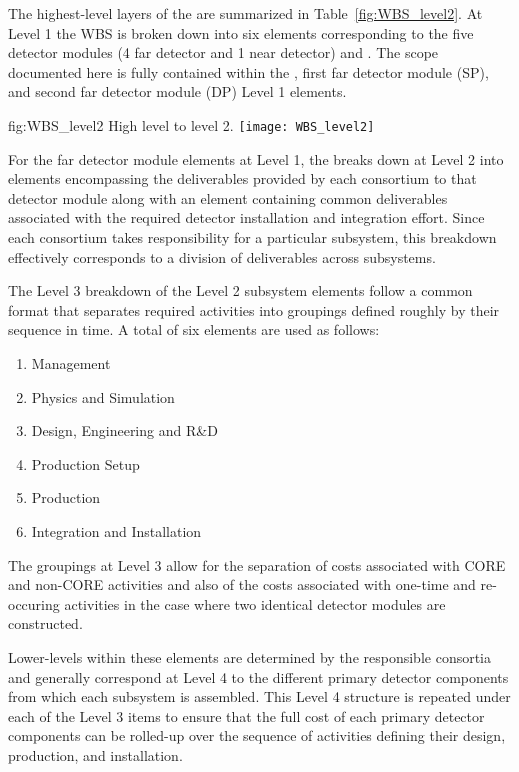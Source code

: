 The highest-level layers of the   are summarized 
in Table~\ref{fig:WBS_level2}.  At Level 1 the WBS is broken down into 
six elements corresponding to the five  detector modules (4 
far detector and 1 near detector) and .  The scope documented
here is fully contained within the , first far detector module 
(SP), and second far detector module (DP) Level 1 elements.   
\begin{dunefigure}{fig:WBS_level2}
  {High level   to level 2.}
  \texttt{[image: WBS\_level2]}
\end{dunefigure}

For the far detector module elements at Level 1, the  breaks 
down at Level 2 into elements encompassing the deliverables provided by 
each consortium to that detector module along with an element containing 
common deliverables associated with the required detector installation 
and integration effort.  Since each consortium takes responsibility 
for a particular subsystem, this breakdown effectively corresponds to 
a division of deliverables across subsystems. 

The Level 3 breakdown of the Level 2 subsystem  elements follow 
a common format that separates required activities into groupings defined 
roughly by their sequence in time.  A total of six elements are used as 
follows:     
\begin{enumerate}
  \item Management
  \item Physics and Simulation
  \item Design, Engineering and R\&D
  \item Production Setup
  \item Production
  \item Integration and Installation
\end{enumerate}
The groupings at Level 3 allow for the separation of costs associated with 
CORE and non-CORE activities and also of the costs associated with one-time 
and re-occuring activities in the case where two identical detector modules
are constructed.   

Lower-levels within these  elements are determined by 
the responsible consortia and generally correspond at Level 4 to 
the different primary detector components from which each subsystem
is assembled.  This Level 4 structure is repeated under each of the 
Level 3 items to ensure that the full cost of each primary detector 
components can be rolled-up over the sequence of activities defining 
their design, production, and installation.       

